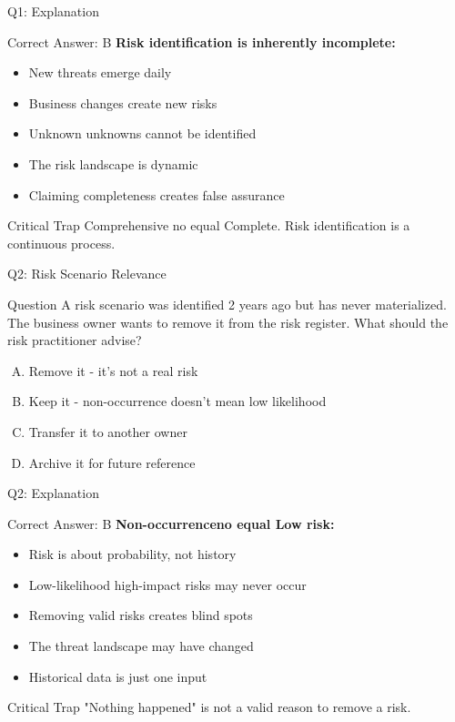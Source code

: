 \documentclass{beamer}
\begin{document}
	\begin{frame}{Q1: Explanation}
		\begin{block}{Correct Answer: B}
			\textbf{Risk identification is inherently incomplete:}
			\begin{itemize}
				\item New threats emerge daily
				\item Business changes create new risks
				\item Unknown unknowns cannot be identified
				\item The risk landscape is dynamic
				\item Claiming completeness creates false assurance
			\end{itemize}
		\end{block}
		\begin{alertblock}{Critical Trap}
			Comprehensive no equal Complete. Risk identification is a continuous process.
		\end{alertblock}
	\end{frame}
	
	\begin{frame}{Q2: Risk Scenario Relevance}
		\begin{block}{Question}
			A risk scenario was identified 2 years ago but has never materialized. The business owner wants to remove it from the risk register. What should the risk practitioner advise?
		\end{block}
		\begin{enumerate}[(A)]
			\item Remove it - it's not a real risk
			\item Keep it - non-occurrence doesn't mean low likelihood
			\item Transfer it to another owner
			\item Archive it for future reference
		\end{enumerate}
	\end{frame}
	
	\begin{frame}{Q2: Explanation}
		\begin{block}{Correct Answer: B}
			\textbf{Non-occurrenceno equal Low risk:}
			\begin{itemize}
				\item Risk is about probability, not history
				\item Low-likelihood high-impact risks may never occur
				\item Removing valid risks creates blind spots
				\item The threat landscape may have changed
				\item Historical data is just one input
			\end{itemize}
		\end{block}
		\begin{alertblock}{Critical Trap}
			"Nothing happened" is not a valid reason to remove a risk.
		\end{alertblock}
	\end{frame}
	
\end{document}
